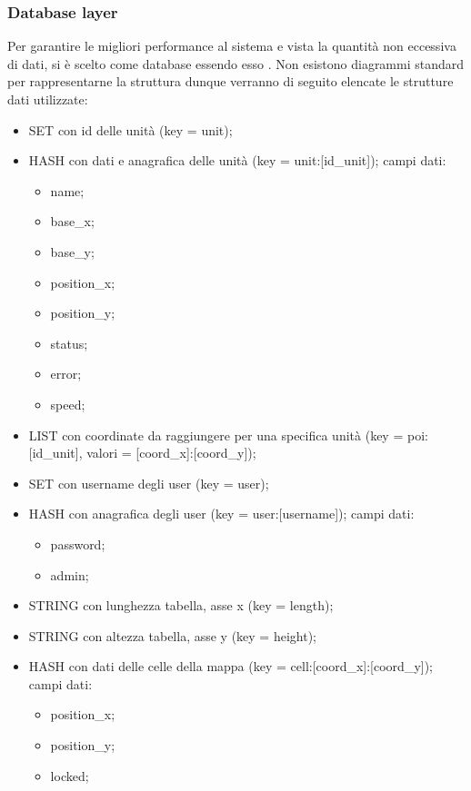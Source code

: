 \subsubsection{Database layer}
Per garantire le migliori performance al sistema e vista la quantità non eccessiva di dati, si è scelto  come database essendo esso . Non esistono diagrammi standard per rappresentarne la struttura dunque verranno di seguito elencate le strutture dati utilizzate:
\begin{itemize}
    \item SET con id delle unità (key = unit);
    \item HASH con dati e anagrafica delle unità (key = unit:[id\_unit]); campi dati:
    \begin{itemize}
        \item name;
        \item base\_x;
        \item base\_y;
        \item position\_x;
        \item position\_y;
        \item status;
        \item error;
        \item speed;
    \end{itemize}
    \item LIST con coordinate  da raggiungere per una specifica unità (key = poi:[id\_unit], valori = [coord\_x]:[coord\_y]);
    \item SET con username degli user (key = user);
    \item HASH con anagrafica degli user (key = user:[username]); campi dati:
    \begin{itemize}
        \item password;
        \item admin;
    \end{itemize}
    \item STRING con lunghezza tabella, asse x (key = length);
    \item STRING con altezza tabella, asse y (key = height);
    \item HASH con dati delle celle della mappa (key = cell:[coord\_x]:[coord\_y]); campi dati:
    \begin{itemize}
        \item position\_x;
        \item position\_y;
        \item locked;

\end{itemize}
\end{itemize}
